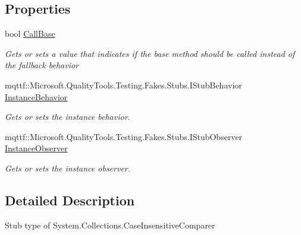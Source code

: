 \subsection*{Properties}
\begin{DoxyCompactItemize}
\item 
bool \hyperlink{class_system_1_1_collections_1_1_fakes_1_1_stub_case_insensitive_comparer_a52d7e63fb5b75deeae6f20f54155e3b5}{Call\-Base}
\begin{DoxyCompactList}\small\item\em Gets or sets a value that indicates if the base method should be called instead of the fallback behavior\end{DoxyCompactList}\item 
mqttf\-::\-Microsoft.\-Quality\-Tools.\-Testing.\-Fakes.\-Stubs.\-I\-Stub\-Behavior \hyperlink{class_system_1_1_collections_1_1_fakes_1_1_stub_case_insensitive_comparer_a2dd2492904fc62fae63ae00e57282f67}{Instance\-Behavior}
\begin{DoxyCompactList}\small\item\em Gets or sets the instance behavior.\end{DoxyCompactList}\item 
mqttf\-::\-Microsoft.\-Quality\-Tools.\-Testing.\-Fakes.\-Stubs.\-I\-Stub\-Observer \hyperlink{class_system_1_1_collections_1_1_fakes_1_1_stub_case_insensitive_comparer_a504c0525e9fe0a3d89d6dfb8381e2124}{Instance\-Observer}
\begin{DoxyCompactList}\small\item\em Gets or sets the instance observer.\end{DoxyCompactList}\end{DoxyCompactItemize}


\subsection{Detailed Description}
Stub type of System.\-Collections.\-Case\-Insensitive\-Comparer



